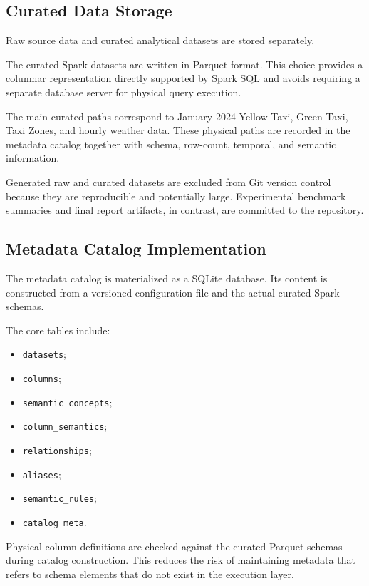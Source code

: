 \subsection{Curated Data Storage}

Raw source data and curated analytical datasets are stored separately.

The curated Spark datasets are written in Parquet format. This choice provides
a columnar representation directly supported by Spark SQL and avoids requiring
a separate database server for physical query execution.

The main curated paths correspond to January 2024 Yellow Taxi, Green Taxi,
Taxi Zones, and hourly weather data. These physical paths are recorded in the
metadata catalog together with schema, row-count, temporal, and semantic
information.

Generated raw and curated datasets are excluded from Git version control
because they are reproducible and potentially large. Experimental benchmark
summaries and final report artifacts, in contrast, are committed to the
repository.


\subsection{Metadata Catalog Implementation}

The metadata catalog is materialized as a SQLite database. Its content is
constructed from a versioned configuration file and the actual curated Spark
schemas.

The core tables include:

\begin{itemize}

    \item \texttt{datasets};
    \item \texttt{columns};
    \item \texttt{semantic\_concepts};
    \item \texttt{column\_semantics};
    \item \texttt{relationships};
    \item \texttt{aliases};
    \item \texttt{semantic\_rules};
    \item \texttt{catalog\_meta}.

\end{itemize}

Physical column definitions are checked against the curated Parquet schemas
during catalog construction. This reduces the risk of maintaining metadata
that refers to schema elements that do not exist in the execution layer.


